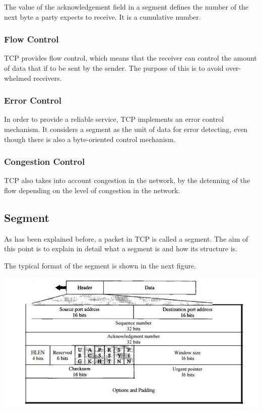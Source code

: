 \documentclass[12pt,a4paper]{report}
\begin{document}
The value of the acknowledgement field in a segment defines the number of the next byte a party expects to receive. It is a cumulative number. 

\subsubsection{Flow Control}
TCP provides flow control, which means that the receiver can control the amount of data that if to be sent by the sender. The purpose of this is to avoid over-whelmed receivers. 

\subsubsection{Error Control}
In order to provide a reliable service, TCP implements an error control mechanism. It considers a segment as the unit of data for error detecting, even though there is also a byte-oriented control mechanism. 

\subsubsection{Congestion Control}
TCP also takes into account congestion in the network, by the detenning of the flow depending on the level of congestion in the network.





\subsection{Segment}
As has been explained before, a packet in TCP is called a segment. The aim of this point is to explain in detail what a segment is and how its structure is.

The typical format of the segment is shown in the next figure. 


\includegraphics{TCP2}
\end{document}
